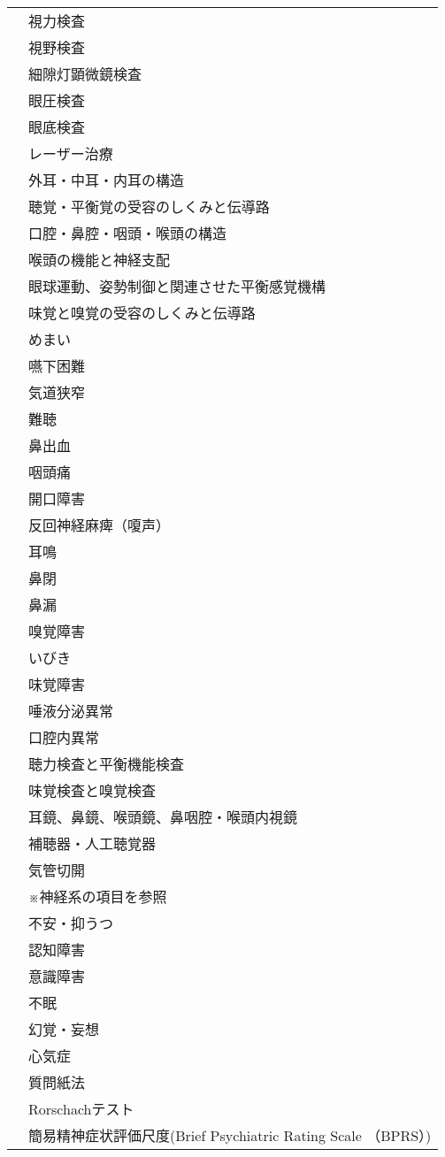 \begin{xltabular}{\linewidth}{XX}
 & 視力検査 \\
 & 視野検査 \\
 & 細隙灯顕微鏡検査 \\
 & 眼圧検査 \\
 & 眼底検査 \\
 & レーザー治療 \\
 & 外耳・中耳・内耳の構造 \\
 & 聴覚・平衡覚の受容のしくみと伝導路 \\
 & 口腔・鼻腔・咽頭・喉頭の構造 \\
 & 喉頭の機能と神経支配 \\
 & 眼球運動、姿勢制御と関連させた平衡感覚機構 \\
 & 味覚と嗅覚の受容のしくみと伝導路 \\
 & めまい \\
 & 嚥下困難 \\
 & 気道狭窄 \\
 & 難聴 \\
 & 鼻出血 \\
 & 咽頭痛 \\
 & 開口障害 \\
 & 反回神経麻痺（嗄声） \\
 & 耳鳴 \\
 & 鼻閉 \\
 & 鼻漏 \\
 & 嗅覚障害 \\
 & いびき \\
 & 味覚障害 \\
 & 唾液分泌異常 \\
 & 口腔内異常 \\
 & 聴力検査と平衡機能検査 \\
 & 味覚検査と嗅覚検査 \\
 & 耳鏡、鼻鏡、喉頭鏡、鼻咽腔・喉頭内視鏡 \\
 & 補聴器・人工聴覚器 \\
 & 気管切開 \\
 & ※神経系の項目を参照 \\
 & 不安・抑うつ \\
 & 認知障害 \\
 & 意識障害 \\
 & 不眠 \\
 & 幻覚・妄想 \\
 & 心気症 \\
 & 質問紙法 \\
 & Rorschachテスト \\
 & 簡易精神症状評価尺度(Brief Psychiatric Rating Scale （BPRS）) \\

\end{xltabular}
